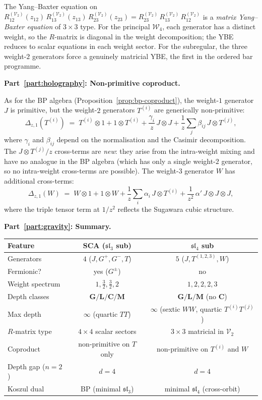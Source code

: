 \begin{computation}
The Yang--Baxter equation on
$R^{(\mathcal V_2)}_{12}(z_{12})\,
R^{(\mathcal V_2)}_{13}(z_{13})\,
R^{(\mathcal V_2)}_{23}(z_{23})
= R^{(\mathcal V_2)}_{23}\,
R^{(\mathcal V_2)}_{13}\,
R^{(\mathcal V_2)}_{12}$
is a \emph{matrix Yang--Baxter equation} of $3 \times 3$
type. For the principal $\mathcal W_4$, each generator
has a distinct weight, so the $R$-matrix is diagonal in
the weight decomposition; the YBE reduces to scalar
equations in each weight sector. For the subregular, the
three weight-$2$ generators force a genuinely matricial
YBE, the first in the ordered bar programme.

\medskip
\noindent\textbf{Part~\ref{part:holography}: Non-primitive coproduct.}

As for the BP algebra
(Proposition~\ref{prop:bp-coproduct}), the weight-$1$
generator $J$ is primitive, but the weight-$2$ generators
$T^{(i)}$ are generically non-primitive:
\[
\Delta_{z,1}(T^{(i)})
\;=\;
T^{(i)} \otimes 1 + 1 \otimes T^{(i)}
+ \frac{\gamma_i}{z}\, J \otimes J
+ \frac{1}{z}\sum_{j} \beta_{ij}\, J \otimes T^{(j)},
\]
where $\gamma_i$ and $\beta_{ij}$ depend on the
normalisation and the Casimir decomposition. The
$J \otimes T^{(j)}/z$ cross-terms are \emph{new}:
they arise from the intra-weight mixing and have no
analogue in the BP algebra (which has only a single
weight-$2$ generator, so no intra-weight cross-terms are
possible). The weight-$3$ generator $W$ has additional
cross-terms:
\[
\Delta_{z,1}(W)
\;=\;
W \otimes 1 + 1 \otimes W
+ \frac{1}{z}\sum_i \alpha_i\, J \otimes T^{(i)}
+ \frac{1}{z^2}\, \alpha'\, J \otimes J \otimes J,
\]
where the triple tensor term at $1/z^2$ reflects the
Sugawara cubic structure.

\medskip
\noindent\textbf{Part~\ref{part:gravity}: Summary.}

\begin{center}
\renewcommand{\arraystretch}{1.15}
\begin{tabular}{lcc}
\textbf{Feature} & \textbf{SCA ($\mathfrak{sl}_3$ sub)}
 & \textbf{$\mathfrak{sl}_4$ sub} \\
\hline
Generators & $4$ ($J, G^+, G^-, T$)
 & $5$ ($J, T^{(1,2,3)}, W$) \\
Fermionic? & yes ($G^\pm$) & no \\
Weight spectrum & $1, \tfrac32, \tfrac32, 2$
 & $1, 2, 2, 2, 3$ \\
Depth classes & $\mathbf{G/L/C/M}$
 & $\mathbf{G/L/M}$ (no $\mathbf{C}$) \\
Max depth & $\infty$ (quartic $TT$)
 & $\infty$ (sextic $WW$, quartic $T^{(i)}T^{(j)}$) \\
$R$-matrix type & $4\times 4$ scalar sectors
 & $3\times 3$ matricial in $\mathcal V_2$ \\
Coproduct & non-primitive on $T$ only
 & non-primitive on $T^{(i)}$ and $W$ \\
Depth gap ($n=2$) & $d=4$ & $d=4$ \\
Koszul dual & BP (minimal $\mathfrak{sl}_3$)
 & minimal $\mathfrak{sl}_4$ (cross-orbit)
\end{tabular}
\end{center}
\end{computation}

